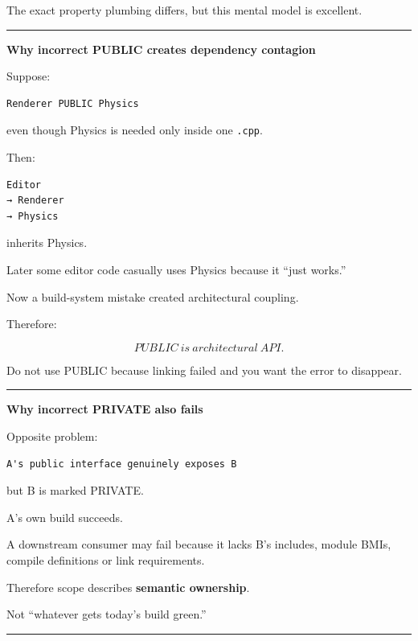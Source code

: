The exact property plumbing differs, but this mental model is excellent.

\begin{center}\rule{0.5\linewidth}{0.5pt}\end{center}

\textbf{Why incorrect PUBLIC creates dependency contagion}

Suppose:

\begin{verbatim}
Renderer PUBLIC Physics
\end{verbatim}

even though Physics is needed only inside one \texttt{.cpp}.

Then:

\begin{verbatim}
Editor
→ Renderer
→ Physics
\end{verbatim}

inherits Physics.

Later some editor code casually uses Physics because it ``just works.''

Now a build-system mistake created architectural coupling.

Therefore:

\[
\boxed{
PUBLIC\ is\ architectural\ API.
}
\]

Do not use PUBLIC because linking failed and you want the error to disappear.

\begin{center}\rule{0.5\linewidth}{0.5pt}\end{center}

\textbf{Why incorrect PRIVATE also fails}

Opposite problem:

\begin{verbatim}
A's public interface genuinely exposes B
\end{verbatim}

but B is marked PRIVATE.

A's own build succeeds.

A downstream consumer may fail because it lacks B's includes, module BMIs, compile definitions or link requirements.

Therefore scope describes \textbf{semantic ownership}.

Not ``whatever gets today's build green.''

\begin{center}\rule{0.5\linewidth}{0.5pt}\end{center}

